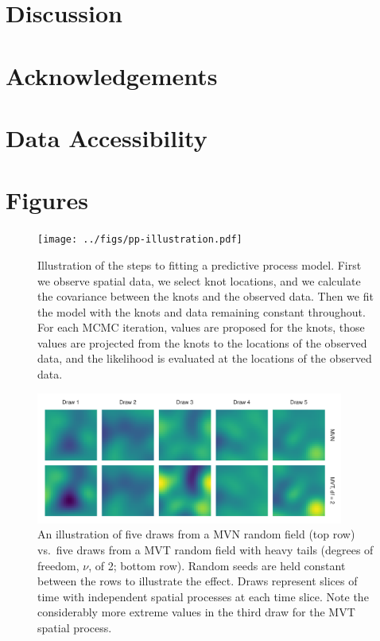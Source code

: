 \documentclass[12pt,english]{article}
\begin{document}
\begin{spacing}{1.25}
\section{Discussion}

\section{Acknowledgements}

\section{Data Accessibility}

\section{Figures}

\begin{figure}[htb]
\begin{center}
  \texttt{[image: ../figs/pp-illustration.pdf]}
\caption{
Illustration of the steps to fitting a predictive process model. 
First we observe spatial data, we select knot locations,
and we calculate the covariance between the knots and the observed data. 
Then we fit the model with the knots and data remaining constant throughout. 
For each MCMC iteration, values are proposed for the
knots, those values are projected from the knots to the locations of the observed data, 
and the likelihood is evaluated at the locations of the observed data.}
\label{fig:didactic}
\end{center}
\end{figure}

\clearpage

\begin{figure}[htb]
\begin{center}
  \includegraphics[width=0.9\textwidth]{../figs/nu-rf-illustration.pdf}
\caption{An illustration of five draws from a MVN random field (top row)
vs.\ five draws from a MVT random field with heavy tails            
(degrees of freedom, $\nu$, of 2; bottom row). Random seeds are held constant
between the rows
to illustrate the effect. Draws represent slices of time with independent spatial 
processes at each time slice. Note the considerably more extreme values in 
the third draw for the MVT spatial process.}
\label{fig:didactic}
\end{center}
\end{figure}


\end{spacing}
\end{document}
